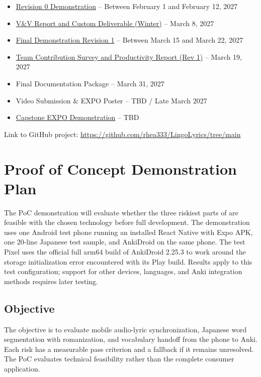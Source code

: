 \documentclass{article}
\begin{document}
\begin{itemize}
    \item \href{https://github.com/rhea333/LingoLyrics/tree/main/docs/Presentations/Rev0Demo}{Revision 0 Demonstration} -- Between February 1 and February 12, 2027
    \item \href{https://github.com/rhea333/LingoLyrics/tree/main/docs/VnVReport}{V\&V Report and Custom Deliverable (Winter)} -- March 8, 2027
    \item \href{https://github.com/rhea333/LingoLyrics/tree/main/docs/Presentations/FinalPresentation}{Final Demonstration Revision 1} -- Between March 15 and March 22, 2027
    \item \href{https://github.com/rhea333/LingoLyrics/tree/main/docs/projMngmnt}{Team Contribution Survey and Productivity Report (Rev 1)} -- March 19, 2027
    \item Final Documentation Package -- March 31, 2027
    \item Video Submission \& EXPO Poster -- TBD / Late March 2027
    \item \href{https://github.com/rhea333/LingoLyrics/tree/main/docs/Presentations/EXPO}{Capstone EXPO Demonstration} -- TBD
\end{itemize}

Link to GitHub project: \url{https://github.com/rhea333/LingoLyrics/tree/main}
\section{Proof of Concept Demonstration Plan}

The PoC demonstration will evaluate whether the three riskiest parts of
\progname{} are feasible with the chosen technology before full development.
The demonstration uses one Android test phone running an installed React Native
with Expo APK, one 20-line Japanese test sample, and AnkiDroid on the same
phone. The test Pixel uses the official full arm64 build of AnkiDroid 2.25.3
to work around the storage initialization error encountered with its Play build.
Results apply to this test configuration; support for
other devices, languages, and Anki integration methods requires later testing.

\subsection{Objective}

The objective is to evaluate mobile audio-lyric synchronization, Japanese word
segmentation with romanization, and vocabulary handoff from the phone to Anki.
Each risk has a measurable pass criterion and a fallback if it remains
unresolved. The PoC evaluates technical feasibility rather than the complete
consumer application.
\end{document}
